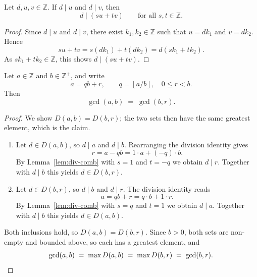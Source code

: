 \documentclass[11pt]{article}
\begin{document}
\begin{lemma}\label{lem:div-comb}
Let $d,u,v \in \mathbb{Z}$. If $d \mid u$ and $d \mid v$, then
\[
    d \mid (su + tv) \qquad \text{for all } s,t \in \mathbb{Z}.
\]
\end{lemma}

\begin{proof}
Since $d \mid u$ and $d \mid v$, there exist $k_1, k_2 \in \mathbb{Z}$ such that
$u = dk_1$ and $v = dk_2$. Hence
\[
    su + tv = s(dk_1) + t(dk_2) = d(sk_1 + tk_2).
\]
As $sk_1 + tk_2 \in \mathbb{Z}$, this shows $d \mid (su+tv)$.
\end{proof}

\begin{lemma}\label{lem:euclid-step}
Let $a \in \mathbb{Z}$ and $b \in \mathbb{Z}^{+}$, and write
\[
    a = qb + r, \qquad q = \left\lfloor a/b \right\rfloor, \quad 0 \le r < b .
\]
Then
\[
    \gcd(a,b) \;=\; \gcd(b,r).
\]
\end{lemma}

\begin{proof}
We show $D(a,b) = D(b,r)$; the two sets then have the same greatest
element, which is the claim.

\medskip

\begin{enumerate}
    \item[($\subseteq$)] Let $d \in D(a,b)$, so $d \mid a$ and $d \mid b$.
    Rearranging the division identity gives
    \[
        r = a - qb = 1 \cdot a + (-q) \cdot b .
    \]
    By Lemma~\ref{lem:div-comb} with $s = 1$ and $t = -q$ we obtain $d \mid r$.
    Together with $d \mid b$ this yields $d \in D(b,r)$.

    \bigskip

    \item[($\supseteq$)] Let $d \in D(b,r)$, so $d \mid b$ and $d \mid r$.
    The division identity reads
    \[
        a = qb + r = q \cdot b + 1 \cdot r .
    \]
    By Lemma~\ref{lem:div-comb} with $s = q$ and $t = 1$ we obtain $d \mid a$.
    Together with $d \mid b$ this yields $d \in D(a,b)$.
\end{enumerate}

\medskip

Both inclusions hold, so $D(a,b) = D(b,r)$. Since $b > 0$, both sets are
non-empty and bounded above, so each has a greatest element, and
\[
    \gcd(a,b) \;=\; \max D(a,b) \;=\; \max D(b,r) \;=\; \gcd(b,r). \qedhere
\]
\end{proof}
\label{sec:euclid}
\end{document}
